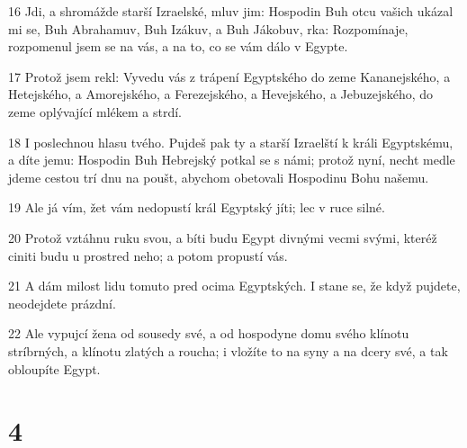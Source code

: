 \par 16 Jdi, a shromážde starší Izraelské, mluv jim: Hospodin Buh otcu vašich ukázal mi se, Buh Abrahamuv, Buh Izákuv, a Buh Jákobuv, rka: Rozpomínaje, rozpomenul jsem se na vás, a na to, co se vám dálo v Egypte.
\par 17 Protož jsem rekl: Vyvedu vás z trápení Egyptského do zeme Kananejského, a Hetejského, a Amorejského, a Ferezejského, a Hevejského, a Jebuzejského, do zeme oplývající mlékem a strdí.
\par 18 I poslechnou hlasu tvého. Pujdeš pak ty a starší Izraelští k králi Egyptskému, a díte jemu: Hospodin Buh Hebrejský potkal se s námi; protož nyní, necht medle jdeme cestou trí dnu na poušt, abychom obetovali Hospodinu Bohu našemu.
\par 19 Ale já vím, žet vám nedopustí král Egyptský jíti; lec v ruce silné.
\par 20 Protož vztáhnu ruku svou, a bíti budu Egypt divnými vecmi svými, kteréž ciniti budu u prostred neho; a potom propustí vás.
\par 21 A dám milost lidu tomuto pred ocima Egyptských. I stane se, že když pujdete, neodejdete prázdní.
\par 22 Ale vypujcí žena od sousedy své, a od hospodyne domu svého klínotu stríbrných, a klínotu zlatých a roucha; i vložíte to na syny a na dcery své, a tak obloupíte Egypt.

\chapter{4}

